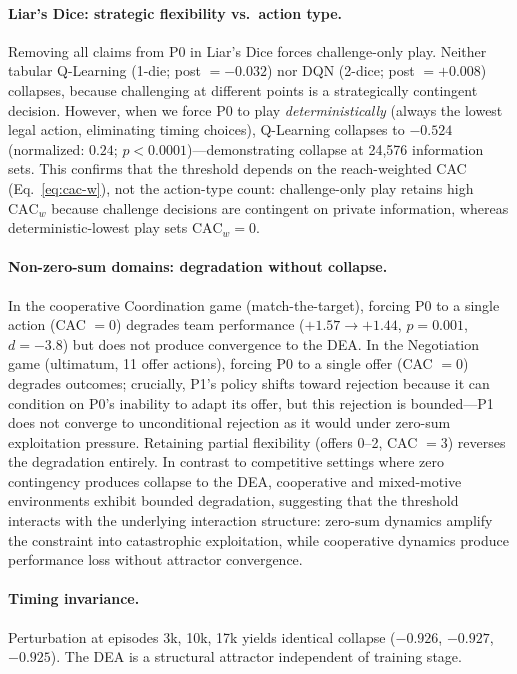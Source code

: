 \documentclass{article}
\begin{document}
\paragraph{Liar's Dice: strategic flexibility vs.\ action type.}
Removing all claims from P0 in Liar's Dice forces challenge-only play. Neither tabular Q-Learning (1-die; post $= -0.032$) nor DQN (2-dice; post $= +0.008$) collapses, because challenging at different points is a strategically contingent decision. However, when we force P0 to play \emph{deterministically} (always the lowest legal action, eliminating timing choices), Q-Learning collapses to $-0.524$ (normalized: $0.24$; $p < 0.0001$)---demonstrating collapse at 24{,}576 information sets. This confirms that the threshold depends on the reach-weighted CAC (Eq.~\ref{eq:cac-w}), not the action-type count: challenge-only play retains high $\text{CAC}_w$ because challenge decisions are contingent on private information, whereas deterministic-lowest play sets $\text{CAC}_w = 0$.

\paragraph{Non-zero-sum domains: degradation without collapse.}
In the cooperative Coordination game (match-the-target), forcing P0 to a single action (CAC $= 0$) degrades team performance ($+1.57 \to +1.44$, $p = 0.001$, $d = -3.8$) but does not produce convergence to the DEA. In the Negotiation game (ultimatum, 11 offer actions), forcing P0 to a single offer (CAC $= 0$) degrades outcomes; crucially, P1's policy shifts toward rejection because it can condition on P0's inability to adapt its offer, but this rejection is bounded---P1 does not converge to unconditional rejection as it would under zero-sum exploitation pressure. Retaining partial flexibility (offers 0--2, CAC $= 3$) reverses the degradation entirely. In contrast to competitive settings where zero contingency produces collapse to the DEA, cooperative and mixed-motive environments exhibit bounded degradation, suggesting that the threshold interacts with the underlying interaction structure: zero-sum dynamics amplify the constraint into catastrophic exploitation, while cooperative dynamics produce performance loss without attractor convergence.

\paragraph{Timing invariance.}
Perturbation at episodes 3k, 10k, 17k yields identical collapse ($-0.926$, $-0.927$, $-0.925$). The DEA is a structural attractor independent of training stage.
\end{document}
